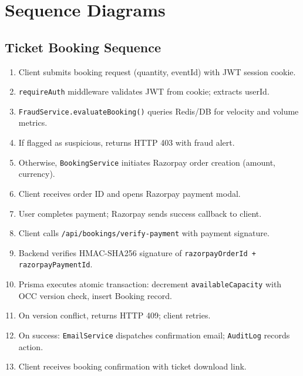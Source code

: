 \documentclass[12pt,a4paper]{report}
\begin{document}
\section{Sequence Diagrams}

\subsection{Ticket Booking Sequence}
\begin{enumerate}[leftmargin=2em]
    \item Client submits booking request (quantity, eventId) with JWT session cookie.
    \item \texttt{requireAuth} middleware validates JWT from cookie; extracts userId.
    \item \texttt{FraudService.evaluateBooking()} queries Redis/DB for velocity and volume metrics.
    \item If flagged as suspicious, returns HTTP 403 with fraud alert.
    \item Otherwise, \texttt{BookingService} initiates Razorpay order creation (amount, currency).
    \item Client receives order ID and opens Razorpay payment modal.
    \item User completes payment; Razorpay sends success callback to client.
    \item Client calls \texttt{/api/bookings/verify-payment} with payment signature.
    \item Backend verifies HMAC-SHA256 signature of \texttt{razorpayOrderId + razorpayPaymentId}.
    \item Prisma executes atomic transaction: decrement \texttt{availableCapacity} with OCC version check, insert Booking record.
    \item On version conflict, returns HTTP 409; client retries.
    \item On success: \texttt{EmailService} dispatches confirmation email; \texttt{AuditLog} records action.
    \item Client receives booking confirmation with ticket download link.
\end{enumerate}
\end{document}
